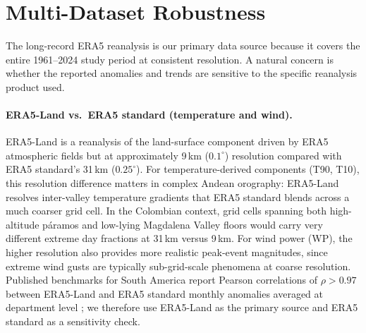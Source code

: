 \documentclass[12pt]{article}
\begin{document}
\section{Multi-Dataset Robustness}\label{sec:robustness}

The long-record ERA5 reanalysis is our primary data source because it covers the entire 1961--2024 study period at consistent resolution. A natural concern is whether the reported anomalies and trends are sensitive to the specific reanalysis product used.

\paragraph{ERA5-Land vs.\ ERA5 standard (temperature and wind).} ERA5-Land is a reanalysis of the land-surface component driven by ERA5 atmospheric fields but at approximately 9\,km ($0.1^\circ$) resolution compared with ERA5 standard's 31\,km ($0.25^\circ$). For temperature-derived components (T90, T10), this resolution difference matters in complex Andean orography: ERA5-Land resolves inter-valley temperature gradients that ERA5 standard blends across a much coarser grid cell. In the Colombian context, grid cells spanning both high-altitude p\'aramos and low-lying Magdalena Valley floors would carry very different extreme day fractions at 31\,km versus 9\,km. For wind power (WP), the higher resolution also provides more realistic peak-event magnitudes, since extreme wind gusts are typically sub-grid-scale phenomena at coarse resolution. Published benchmarks for South America report Pearson correlations of $\rho > 0.97$ between ERA5-Land and ERA5 standard monthly anomalies averaged at department level \citep{hersbach2020}; we therefore use ERA5-Land as the primary source and ERA5 standard as a sensitivity check.
\end{document}
